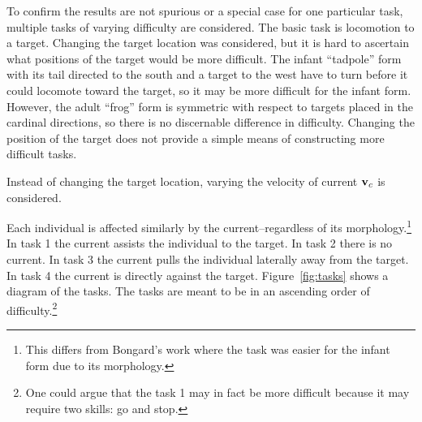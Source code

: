 To confirm the results are not spurious or a special case for one
particular task, multiple tasks of varying difficulty are considered.
The basic task is locomotion to a target.  Changing the target
location was considered, but it is hard to ascertain what positions of
the target would be more difficult.  The infant ``tadpole'' form with
its tail directed to the south and a target to the west have to turn
before it could locomote toward the target, so it may be more
difficult for the infant form.  However, the adult ``frog'' form is
symmetric with respect to targets placed in the cardinal directions,
so there is no discernable difference in difficulty.  Changing the
position of the target does not provide a simple means of constructing
more difficult tasks.  

Instead of changing the target location, varying the velocity of
current $\mathbf{v}_c$ is considered.  

Each individual is affected similarly by the current--regardless of
its morphology.\footnote{This differs from Bongard's work where the
  task was easier for the infant form due to its morphology.}  In task
1 the current assists the individual to the target.  In task 2 there
is no current.  In task 3 the current pulls the individual laterally
away from the target.  In task 4 the current is directly against the
target. Figure~\ref{fig:tasks} shows a diagram of the tasks.  The
tasks are meant to be in an ascending order of
difficulty.\footnote{One could argue that the task 1 may in fact be
  more difficult because it may require two skills: go and stop.}

